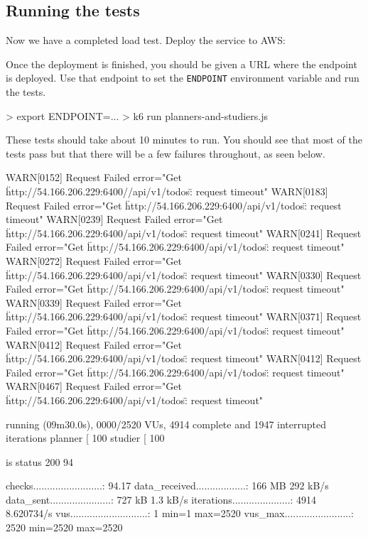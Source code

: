\documentclass{csse4400}
\begin{document}
\subsection{Running the tests}

Now we have a completed load test.
Deploy the service to AWS:


Once the deployment is finished,
you should be given a URL where the endpoint is deployed.
Use that endpoint to set the \texttt{ENDPOINT} environment variable and run the tests.

\begin{code}[language=bash,numbers=none]{}
> export ENDPOINT=...
> k6 run planners-and-studiers.js
\end{code}

These tests should take about 10 minutes to run.
You should see that most of the tests pass but that there will be a few failures throughout,
as seen below.

\begin{code}[language=bash,numbers=none]{}
WARN[0152] Request Failed                                error="Get \"http://54.166.206.229:6400//api/v1/todos\": request timeout"
WARN[0183] Request Failed                                error="Get \"http://54.166.206.229:6400/api/v1/todos\": request timeout"
WARN[0239] Request Failed                                error="Get \"http://54.166.206.229:6400/api/v1/todos\": request timeout"
WARN[0241] Request Failed                                error="Get \"http://54.166.206.229:6400/api/v1/todos\": request timeout"
WARN[0272] Request Failed                                error="Get \"http://54.166.206.229:6400/api/v1/todos\": request timeout"
WARN[0330] Request Failed                                error="Get \"http://54.166.206.229:6400/api/v1/todos\": request timeout"
WARN[0339] Request Failed                                error="Get \"http://54.166.206.229:6400/api/v1/todos\": request timeout"
WARN[0371] Request Failed                                error="Get \"http://54.166.206.229:6400/api/v1/todos\": request timeout"
WARN[0412] Request Failed                                error="Get \"http://54.166.206.229:6400/api/v1/todos\": request timeout"
WARN[0412] Request Failed                                error="Get \"http://54.166.206.229:6400/api/v1/todos\": request timeout"
WARN[0467] Request Failed                                error="Get \"http://54.166.206.229:6400/api/v1/todos\": request timeout"

running (09m30.0s), 0000/2520 VUs, 4914 complete and 1947 interrupted iterations
planner  [ 100%
studier  [ 100%

      is status 200
       94%

     checks.........................: 94.17%
     data_received..................: 166 MB 292 kB/s
     data_sent......................: 727 kB 1.3 kB/s
     iterations.....................: 4914   8.620734/s
     vus............................: 1      min=1       max=2520
     vus_max........................: 2520   min=2520    max=2520
\end{code}
\end{document}
